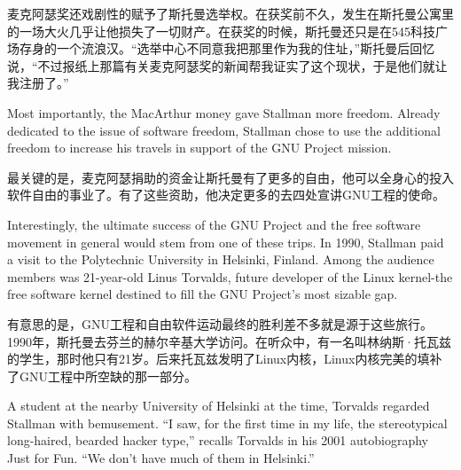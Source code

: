 \ifdefined\chs
麦克阿瑟奖还戏剧性的赋予了斯托曼选举权。在获奖前不久，发生在斯托曼公寓里的一场大火几乎让他损失了一切财产。在获奖的时候，斯托曼还只是在545科技广场存身的一个流浪汉。``选举中心不同意我把那里作为我的住址，''斯托曼后回忆说，``不过报纸上那篇有关麦克阿瑟奖的新闻帮我证实了这个现状，于是他们就让我注册了。''
\fi

\ifdefined\eng
Most importantly, the MacArthur money gave Stallman more freedom. Already dedicated to the issue of software freedom, Stallman chose to use the additional freedom to increase his travels in support of the GNU Project mission.
\fi

\ifdefined\chs
最关键的是，麦克阿瑟捐助的资金让斯托曼有了更多的自由，他可以全身心的投入软件自由的事业了。有了这些资助，他决定更多的去四处宣讲GNU工程的使命。
\fi

\ifdefined\eng
Interestingly, the ultimate success of the GNU Project and the free software movement in general would stem from one of these trips. In 1990, Stallman paid a visit to the Polytechnic University in Helsinki, Finland. Among the audience members was 21-year-old Linus Torvalds, future developer of the Linux kernel-the free software kernel destined to fill the GNU Project's most sizable gap.
\fi

\ifdefined\chs
有意思的是，GNU工程和自由软件运动最终的胜利差不多就是源于这些旅行。1990年，斯托曼去芬兰的赫尔辛基大学访问。在听众中，有一名叫林纳斯·托瓦兹的学生，那时他只有21岁。后来托瓦兹发明了Linux内核，Linux内核完美的填补了GNU工程中所空缺的那一部分。
\fi

\ifdefined\eng
A student at the nearby University of Helsinki at the time, Torvalds regarded Stallman with bemusement. ``I saw, for the first time in my life, the stereotypical long-haired, bearded hacker type,'' recalls Torvalds in his 2001 autobiography Just for Fun. ``We don't have much of them in Helsinki.''
\fi

